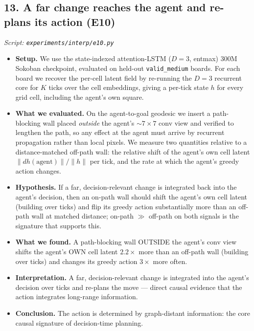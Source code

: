 \documentclass[11pt]{article}
\begin{document}
\subsection*{13. A far change reaches the agent and re-plans its action (E10)}
\textit{Script: \texttt{experiments/interp/e10.py}}
\begin{itemize}
\item \textbf{Setup.} We use the state-indexed attention-LSTM ($D{=}3$, entmax) $300$M Sokoban checkpoint, evaluated on held-out \texttt{valid\_medium} boards. For each board we recover the per-cell latent field by re-running the $D{=}3$ recurrent core for $K$ ticks over the cell embeddings, giving a per-tick state $h$ for every grid cell, including the agent's own square.
\item \textbf{What we evaluated.} On the agent-to-goal geodesic we insert a path-blocking wall placed \emph{outside} the agent's $\sim 7\times 7$ conv view and verified to lengthen the path, so any effect at the agent must arrive by recurrent propagation rather than local pixels. We measure two quantities relative to a distance-matched off-path wall: the relative shift of the agent's own cell latent $\lVert dh(\text{agent})\rVert / \lVert h\rVert$ per tick, and the rate at which the agent's greedy action changes.
\item \textbf{Hypothesis.} If a far, decision-relevant change is integrated back into the agent's decision, then an on-path wall should shift the agent's own cell latent (building over ticks) and flip its greedy action substantially more than an off-path wall at matched distance; on-path $\gg$ off-path on both signals is the signature that supports this.
\item \textbf{What we found.} A path-blocking wall OUTSIDE the agent's conv view shifts the agent's OWN cell latent $2.2\times$ more than an off-path wall (building over ticks) and changes its greedy action $3\times$ more often.
\item \textbf{Interpretation.} A far, decision-relevant change is integrated into the agent's decision over ticks and re-plans the move --- direct causal evidence that the action integrates long-range information.
\item \textbf{Conclusion.} The action is determined by graph-distant information: the core causal signature of decision-time planning.
\end{itemize}
\clearpage
\end{document}
